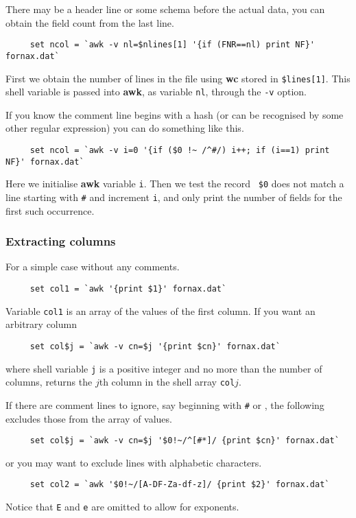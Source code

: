 \documentclass[twoside,11pt]{article}
\newcommand{\htmlref}[2]{#1}
\begin{document}
There may be a header line or some schema before the actual data, you
can obtain the field count from the last line.
\small
\begin{verbatim}
     set ncol = `awk -v nl=$nlines[1] '{if (FNR==nl) print NF}' fornax.dat`
\end{verbatim}
\normalsize
First we obtain the number of lines in the file using {\bf wc} stored
in {\tt \$lines[1]}.  This shell variable is passed into {\bf awk}, as 
variable {\tt nl}, through the {\tt -v} option.

If you know the comment line begins with a hash (or can be recognised
by some other \htmlref{{\sf regular expression}}{sc4_gl_reg_exp}) you
can do something like this.
\small
\begin{verbatim}
     set ncol = `awk -v i=0 '{if ($0 !~ /^#/) i++; if (i==1) print NF}' fornax.dat`
\end{verbatim}
\normalsize
Here we initialise {\bf awk} variable {\tt i}.  Then we test the record {\tt
\$0} does not match a line starting with {\tt \#} and increment {\tt i},
and only print the number of fields for the first such occurrence.


\subsubsection{Extracting columns}

For a simple case without any comments.
\small
\begin{verbatim}
     set col1 = `awk '{print $1}' fornax.dat`
\end{verbatim}
\normalsize
Variable {\tt col1} is an array of the values of the first column.  If
you want an arbitrary column
\small
\begin{verbatim}
     set col$j = `awk -v cn=$j '{print $cn}' fornax.dat`
\end{verbatim}
\normalsize
where \htmlref{{\sf shell variable}}{sc4_gl_she} {\tt j} is a positive
integer and no more than the \htmlref{number of
columns}{sc4_se_find_nf}, returns the $j$th column in the shell array
{\tt col}$j$.

If there are comment lines to ignore, say beginning with {\tt \#} or
{\tt *}, the following excludes those from the array of values.
\small
\begin{verbatim}
     set col$j = `awk -v cn=$j '$0!~/^[#*]/ {print $cn}' fornax.dat`
\end{verbatim}
\normalsize
or you may want to exclude lines with alphabetic characters.
\small
\begin{verbatim}
     set col2 = `awk '$0!~/[A-DF-Za-df-z]/ {print $2}' fornax.dat`
\end{verbatim}
\normalsize
Notice that {\tt E} and {\tt e} are omitted to allow for exponents.
\end{document}
